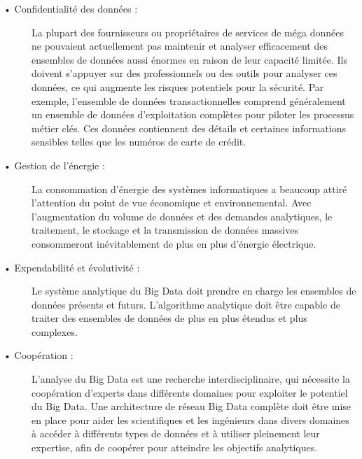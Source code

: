 \begin{description}
\item[•	Confidentialité des données :] La plupart des fournisseurs ou propriétaires de services de méga données ne pouvaient actuellement pas maintenir et analyser efficacement des ensembles de données aussi énormes en raison de leur capacité limitée. Ils doivent s'appuyer sur des professionnels ou des outils pour analyser ces données, ce qui augmente les risques potentiels pour la sécurité. Par exemple, l'ensemble de données transactionnelles comprend généralement un ensemble de données d'exploitation complètes pour piloter les processus métier clés. Ces données contiennent des détails et certaines informations sensibles telles que les numéros de carte de crédit.
\item[•	Gestion de l'énergie :] La consommation d'énergie des systèmes informatiques a beaucoup attiré l'attention du point de vue économique et environnemental. Avec l'augmentation du volume de données et des demandes analytiques, le traitement, le stockage et la transmission de données massives consommeront inévitablement de plus en plus d'énergie électrique.
\item[•	Expendabilité et évolutivité :] Le système analytique du Big Data doit prendre en charge les ensembles de données présents et futurs. L'algorithme analytique doit être capable de traiter des ensembles de données de plus en plus étendus et plus complexes.
\item[•	Coopération :] L'analyse du Big Data est une recherche interdisciplinaire, qui nécessite la coopération d'experts dans différents domaines pour exploiter le potentiel du Big Data. Une architecture de réseau Big Data complète doit être mise en place pour aider les scientifiques et les ingénieurs dans divers domaines à accéder à différents types de données et à utiliser pleinement leur expertise, afin de coopérer pour atteindre les objectifs analytiques.

\end{description}
